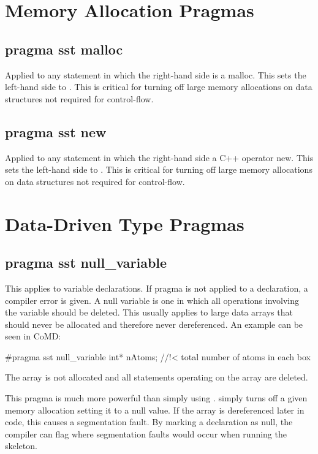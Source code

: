 \section{Memory Allocation Pragmas}
\subsection{pragma sst malloc}
Applied to any statement in which the right-hand side is a malloc. This sets the left-hand side to .
This is critical for turning off large memory allocations on data structures not required for control-flow.


\subsection{pragma sst new}
Applied to any statement in which the right-hand side a C++ operator new. This sets the left-hand side to .
This is critical for turning off large memory allocations on data structures not required for control-flow.

\section{Data-Driven Type Pragmas}
\subsection{pragma sst null\_variable}
This applies to variable declarations. If pragma is not applied to a declaration, a compiler error is given.
A null variable is one in which all operations involving the variable should be deleted.
This usually applies to large data arrays that should never be allocated and therefore never dereferenced.
An example can be seen in CoMD:

\begin{CppCode}
#pragma sst null_variable
   int* nAtoms;         //!< total number of atoms in each box
\end{CppCode}
The array is not allocated and all statements operating on the array are deleted.

This pragma is much more powerful than simply using .
 simply turns off a given memory allocation setting it to a null value.
If the array is dereferenced later in code, this causes a segmentation fault.
By marking a declaration as null, the compiler can flag where segmentation faults would occur when running the skeleton.

